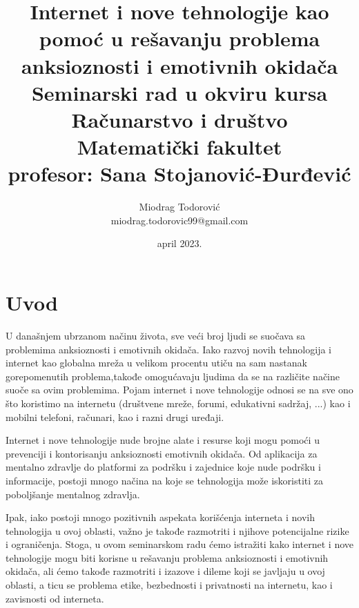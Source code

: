\documentclass[a4paper]{article}
\begin{document}
\title{Internet i nove tehnologije kao pomoć u rešavanju problema anksioznosti i emotivnih okidača\\ \small{Seminarski rad u okviru kursa\\Računarstvo i društvo\\ Matematički fakultet\\ profesor: Sana Stojanović-Đurđević}}

\author{Miodrag Todorović\\ miodrag.todorovic99@gmail.com}
\date{april 2023.}
\maketitle
\renewcommand{\abstractname}{Sažetak}
\renewcommand{\contentsname}{Sadržaj}
\tableofcontents

\newpage

\section{Uvod}
\label{sec:uvod}
U današnjem ubrzanom načinu života, sve veći broj ljudi se suočava sa problemima anksioznosti i emotivnih okidača. Iako razvoj novih tehnologija i internet kao globalna mreža u velikom procentu utiču na sam nastanak gorepomenutih problema,takođe omogućavaju ljudima da se na različite načine suoče sa ovim problemima. Pojam internet i nove tehnologije odnosi se na sve ono što koristimo na internetu (društvene mreže, forumi, edukativni sadržaj, ...) kao i mobilni telefoni, računari, kao i razni drugi uređaji.

Internet i nove tehnologije nude brojne alate i resurse koji mogu pomoći u prevenciji i kontorisanju anksioznosti emotivnih okidača. Od aplikacija za mentalno zdravlje do platformi za podršku i zajednice koje nude podršku i informacije, postoji mnogo načina na koje se tehnologija može iskoristiti za poboljšanje mentalnog zdravlja.

Ipak, iako postoji mnogo pozitivnih aspekata korišćenja interneta i novih tehnologija u ovoj oblasti, važno je takođe razmotriti i njihove potencijalne rizike i ograničenja. Stoga, u ovom seminarskom radu ćemo istražiti kako internet i nove tehnologije mogu biti korisne u rešavanju problema anksioznosti i emotivnih okidača, ali ćemo takođe razmotriti i izazove i dileme koji se javljaju u ovoj oblasti, a ticu se problema etike, bezbednosti i privatnosti na internetu, kao i zavisnosti od interneta.
\end{document}
